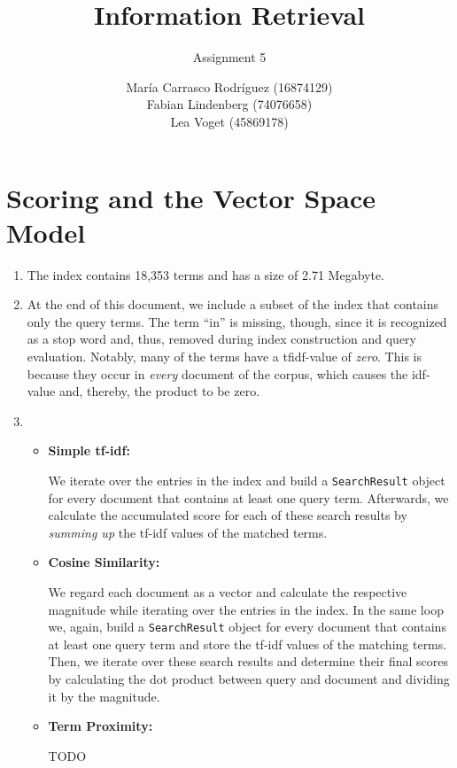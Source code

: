 \documentclass[a4paper,11pt,oneside]{book}
\title{Information Retrieval }
\subtitle{Assignment 5}
\author{ María Carrasco Rodríguez (16874129) \\
		Fabian Lindenberg (74076658)\\
		Lea Voget (45869178)}
\begin{document}
\kostspieligmaketitle

\setcounter{chapter}{2}

\chapter{Scoring and the Vector Space Model}
 

\begin{enumerate}
		\renewcommand{\labelenumi}{\Roman{enumi})}
		\item The index contains 18,353 terms and has a size of 2.71 Megabyte.
		
		\item At the end of this document, we include a subset of the index that contains only the query terms. The term ``in'' is missing, though, since it is recognized as a stop word and, thus, removed during index construction and query evaluation. Notably, many of the terms have a tfidf-value of \emph{zero}. This is because they occur in \emph{every} document of the corpus, which causes the idf-value and, thereby, the product to be zero. 
	
		\item \begin{itemize}
						\item \textbf{Simple tf-idf:}
						
									We iterate over the entries in the index and build a \texttt{SearchResult} object for every document that contains at least one query term. Afterwards, we calculate the accumulated score for each of these search results by \emph{summing up} the tf-idf values of the matched terms.
									
						\item \textbf{Cosine Similarity:}
						
									We regard each document as a vector and calculate the respective magnitude while iterating over the entries in the index. In the same loop we, again, build a \texttt{SearchResult} object for every document that contains at least one query term and store the tf-idf values of the matching terms. Then, we iterate over these search results and determine their final scores by calculating the dot product between query and document and dividing it by the magnitude.
									
						\item \textbf{Term Proximity:}
						
									TODO
					\end{itemize}
		

\end{enumerate}
\end{document}
